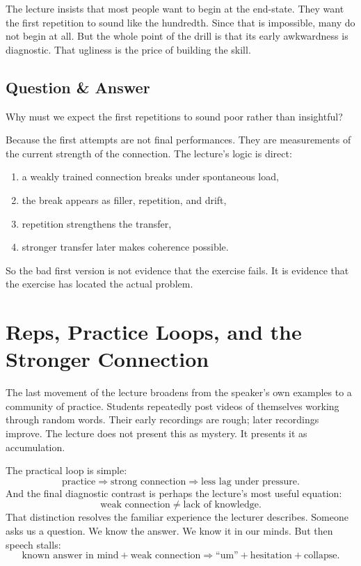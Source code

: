 The lecture insists that most people want to begin at the end-state. They want the first repetition to sound like the hundredth. Since that is impossible, many do not begin at all. But the whole point of the drill is that its early awkwardness is diagnostic. That ugliness is the price of building the skill.

\subsection{Question \& Answer}

Why must we expect the first repetitions to sound poor rather than insightful?

Because the first attempts are not final performances. They are measurements of the current strength of the connection. The lecture's logic is direct:
\begin{enumerate}
\item a weakly trained connection breaks under spontaneous load,
\item the break appears as filler, repetition, and drift,
\item repetition strengthens the transfer,
\item stronger transfer later makes coherence possible.
\end{enumerate}
So the bad first version is not evidence that the exercise fails. It is evidence that the exercise has located the actual problem.

\section{Reps, Practice Loops, and the Stronger Connection}

The last movement of the lecture broadens from the speaker's own examples to a community of practice. Students repeatedly post videos of themselves working through random words. Their early recordings are rough; later recordings improve. The lecture does not present this as mystery. It presents it as accumulation.

The practical loop is simple:
\begin{equation}
\text{practice} \Longrightarrow \text{strong connection} \Longrightarrow \text{less lag under pressure}.
\end{equation}
And the final diagnostic contrast is perhaps the lecture's most useful equation:
\begin{equation}
\text{weak connection} \neq \text{lack of knowledge}.
\end{equation}
That distinction resolves the familiar experience the lecturer describes. Someone asks us a question. We know the answer. We know it in our minds. But then speech stalls:
\begin{equation}
\text{known answer in mind} + \text{weak connection} \Longrightarrow \text{``um''} + \text{hesitation} + \text{collapse}.
\end{equation}

